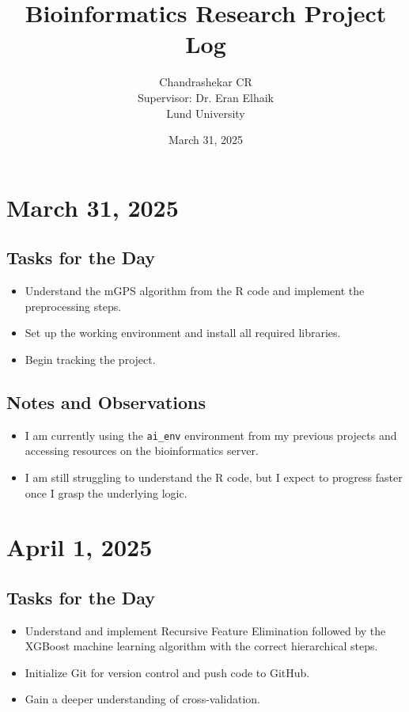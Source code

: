 \documentclass{article}
\title{\textbf{Bioinformatics Research Project Log}}
\author{Chandrashekar CR \\ Supervisor: Dr. Eran Elhaik \\ Lund University}
\date{March 31, 2025}
\begin{document}
\maketitle
\tableofcontents
\newpage

\section{March 31, 2025}

\subsection*{Tasks for the Day}
\begin{itemize}
    \item Understand the mGPS algorithm from the R code and implement the preprocessing steps.
    \item Set up the working environment and install all required libraries.
    \item Begin tracking the project.
\end{itemize}

\subsection*{Notes and Observations}
\begin{itemize}
    \item I am currently using the \texttt{ai\_env} environment from my previous projects and accessing resources on the bioinformatics server.
    \item I am still struggling to understand the R code, but I expect to progress faster once I grasp the underlying logic.
\end{itemize}

\section{April 1, 2025}

\subsection*{Tasks for the Day}
\begin{itemize}
    \item Understand and implement Recursive Feature Elimination followed by the XGBoost machine learning algorithm with the correct hierarchical steps.
    \item Initialize Git for version control and push code to GitHub.
    \item Gain a deeper understanding of cross-validation.
\end{itemize}
\end{document}
